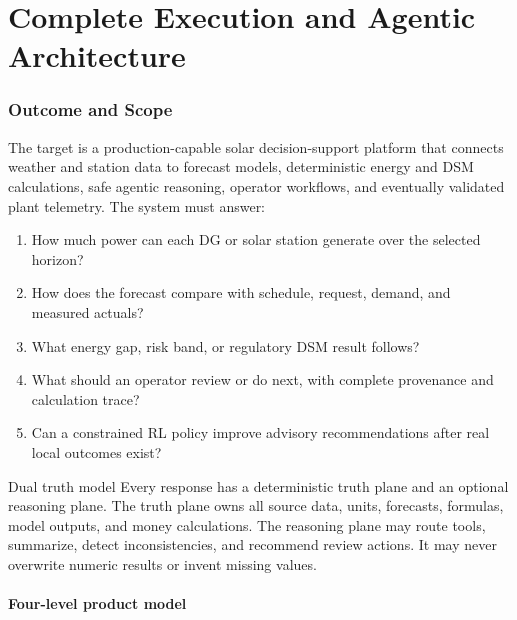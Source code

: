 \part{Complete Execution and Agentic Architecture}

\section{Outcome and Scope}

The target is a production-capable solar decision-support platform that connects weather and
station data to forecast models, deterministic energy and DSM calculations, safe agentic
reasoning, operator workflows, and eventually validated plant telemetry. The system must answer:

\begin{enumerate}
  \item How much power can each DG or solar station generate over the selected horizon?
  \item How does the forecast compare with schedule, request, demand, and measured actuals?
  \item What energy gap, risk band, or regulatory DSM result follows?
  \item What should an operator review or do next, with complete provenance and calculation trace?
  \item Can a constrained RL policy improve advisory recommendations after real local outcomes exist?
\end{enumerate}

\begin{callout}{Dual truth model}
Every response has a deterministic truth plane and an optional reasoning plane. The truth plane
owns all source data, units, forecasts, formulas, model outputs, and money calculations. The
reasoning plane may route tools, summarize, detect inconsistencies, and recommend review actions.
It may never overwrite numeric results or invent missing values.
\end{callout}

\subsection{Four-level product model}

